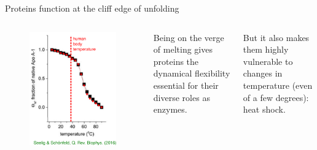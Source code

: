 \documentclass{beamer}
\begin{document}
\begin{frame}{Proteins function at the cliff edge of unfolding}

  \begin{columns}
  \begin{figure}
    \includegraphics[width=\textwidth]{thermal_unfold.pdf}
  \end{figure}

  \pause
   Being on the verge of melting gives proteins
  the {\color{blue}dynamical flexibility} essential for their diverse roles as enzymes.

  \pause

  \vspace{1em}
  
  But it also makes them highly vulnerable to changes in temperature
  (even of a few degrees):  {\color{red} heat shock}.
  \end{columns}
\end{frame}
\end{document}
